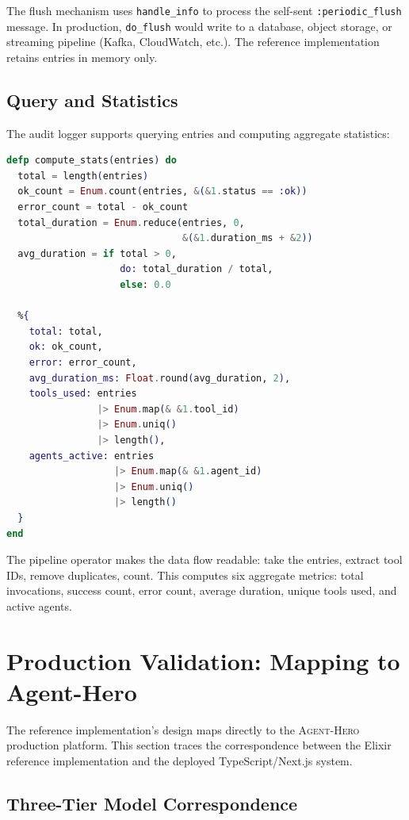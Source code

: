 \documentclass[12pt,a4paper]{article}
\theoremstyle{plain}
\theoremstyle{definition}
\newcommand{\agenthero}{\textsc{Agent-Hero}}
\begin{document}
The flush mechanism uses \texttt{handle\_info} to process the self-sent \texttt{:periodic\_flush} message. In production, \texttt{do\_flush} would write to a database, object storage, or streaming pipeline (Kafka, CloudWatch, etc.). The reference implementation retains entries in memory only.

\subsection{Query and Statistics}

The audit logger supports querying entries and computing aggregate statistics:

\begin{lstlisting}[language=elixir, caption={Audit statistics computation.}, label={lst:stats}]
defp compute_stats(entries) do
  total = length(entries)
  ok_count = Enum.count(entries, &(&1.status == :ok))
  error_count = total - ok_count
  total_duration = Enum.reduce(entries, 0,
                               &(&1.duration_ms + &2))
  avg_duration = if total > 0,
                    do: total_duration / total,
                    else: 0.0

  %{
    total: total,
    ok: ok_count,
    error: error_count,
    avg_duration_ms: Float.round(avg_duration, 2),
    tools_used: entries
                |> Enum.map(& &1.tool_id)
                |> Enum.uniq()
                |> length(),
    agents_active: entries
                   |> Enum.map(& &1.agent_id)
                   |> Enum.uniq()
                   |> length()
  }
end
\end{lstlisting}

The pipeline operator makes the data flow readable: take the entries, extract tool IDs, remove duplicates, count. This computes six aggregate metrics: total invocations, success count, error count, average duration, unique tools used, and active agents.


\section{Production Validation: Mapping to Agent-Hero}
\label{sec:production}

The reference implementation's design maps directly to the \agenthero{} production platform. This section traces the correspondence between the Elixir reference implementation and the deployed TypeScript/Next.js system.

\subsection{Three-Tier Model Correspondence}
\end{document}

